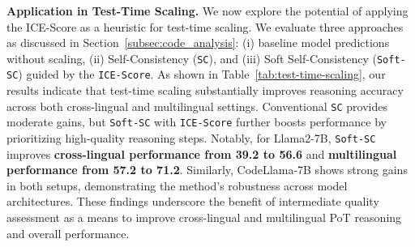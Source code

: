 \textbf{Application in Test-Time Scaling.}
% 
We now explore the potential of applying the ICE-Score as a heuristic for test-time scaling. 
%
We evaluate three approaches as discussed in Section~\ref{subsec:code_analysis}: (i) baseline model predictions without scaling, (ii) Self-Consistency (\texttt{SC}), and (iii) Soft Self-Consistency (\texttt{Soft-SC}) guided by the \texttt{ICE-Score}.
%
As shown in Table~\ref{tab:test-time-scaling}, our results indicate that test-time scaling substantially improves reasoning accuracy across both cross-lingual and multilingual settings. 
%
Conventional \texttt{SC} provides moderate gains, but \texttt{Soft-SC} with \texttt{ICE-Score} further boosts performance by prioritizing high-quality reasoning steps. 
%
Notably, for Llama2-7B, \texttt{Soft-SC} improves \textbf{cross-lingual performance from 39.2 to 56.6} and \textbf{multilingual performance from 57.2 to 71.2}. 
%
Similarly, CodeLlama-7B shows strong gains in both setups, demonstrating the method's robustness across model architectures.
%
These findings underscore the benefit of intermediate quality assessment as a means to improve cross-lingual and multilingual PoT reasoning and overall performance.

